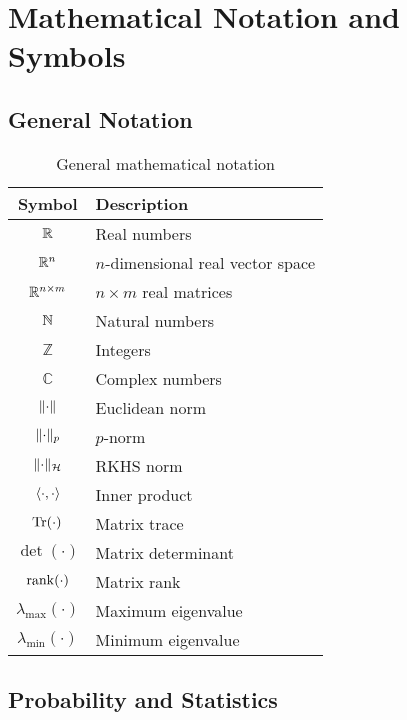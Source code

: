 \section{Mathematical Notation and Symbols}

\subsection{General Notation}

\begin{table}[h]
\centering
\begin{tabular}{cl}
\toprule
\textbf{Symbol} & \textbf{Description} \\
\midrule
$\mathbb{R}$ & Real numbers \\
$\mathbb{R}^n$ & $n$-dimensional real vector space \\
$\mathbb{R}^{n \times m}$ & $n \times m$ real matrices \\
$\mathbb{N}$ & Natural numbers \\
$\mathbb{Z}$ & Integers \\
$\mathbb{C}$ & Complex numbers \\
$\lVert\cdot\rVert$ & Euclidean norm \\
$\lVert\cdot\rVert_p$ & $p$-norm \\
$\lVert\cdot\rVert_{\mathcal{H}}$ & RKHS norm \\
$\langle\cdot, \cdot\rangle$ & Inner product \\
$\operatorname{Tr}(\cdot)$ & Matrix trace \\
$\det(\cdot)$ & Matrix determinant \\
$\operatorname{rank}(\cdot)$ & Matrix rank \\
$\lambda_{\max}(\cdot)$ & Maximum eigenvalue \\
$\lambda_{\min}(\cdot)$ & Minimum eigenvalue \\
\bottomrule
\end{tabular}
\caption{General mathematical notation}
\end{table}

\subsection{Probability and Statistics}

